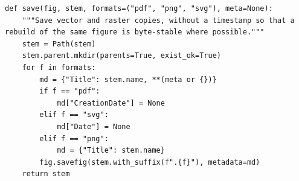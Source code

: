\begin{lstlisting}[firstnumber=86]
def save(fig, stem, formats=("pdf", "png", "svg"), meta=None):
    """Save vector and raster copies, without a timestamp so that a rebuild of the same figure is byte-stable where possible."""
    stem = Path(stem)
    stem.parent.mkdir(parents=True, exist_ok=True)
    for f in formats:
        md = {"Title": stem.name, **(meta or {})}
        if f == "pdf":
            md["CreationDate"] = None
        elif f == "svg":
            md["Date"] = None
        elif f == "png":
            md = {"Title": stem.name}
        fig.savefig(stem.with_suffix(f".{f}"), metadata=md)
    return stem
\end{lstlisting}
